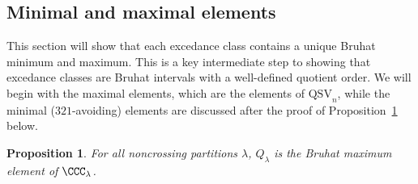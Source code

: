 \documentclass[12pt]{amsart}
\newtheorem{prop}[equation]{Proposition}
\theoremstyle{definition}
\theoremstyle{remark}
\numberwithin{equation}{section}
\newcommand{\QSV}{\mathrm{QSV}}
\begin{document}
\subsection{Minimal and maximal elements}
\label{sec:ex2}

This section will show that each excedance class contains a unique Bruhat minimum and maximum.  
This is a key intermediate step to showing that excedance classes are Bruhat intervals with a well-defined quotient order.  
We will begin with the maximal elements, which are the elements of $\QSV_{n}$, while the minimal ($321$-avoiding) elements are discussed after the proof of Proposition~\ref{prop:QSVinterval} below.

\begin{prop}
\label{prop:QSVinterval}
For all noncrossing partitions $\lambda$, $Q_{\lambda}$ is the Bruhat maximum element of $\CCC_{\lambda}$.  
\end{prop}
\end{document}
